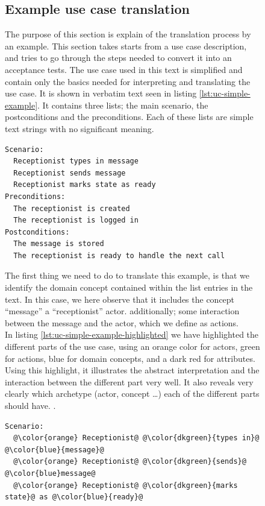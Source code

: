 \begin{figure}[!htbp]

\subsection{Example use case translation}
The purpose of this section is explain of the translation process by an example.
This section takes starts from a use case description, and tries to go through the steps needed to convert it into an acceptance tests. The use case used in this text is simplified and contain only the basics needed for interpreting and translating the use case. It is shown in verbatim text seen in listing \ref{lst:uc-simple-example}. It contains three lists; the main scenario, the postconditions and the preconditions. Each of these lists are simple text strings with no significant meaning.
\begin{lstlisting}[frame=single,style=usecase, caption=Use case example, label=lst:uc-simple-example]
Scenario:
  Receptionist types in message
  Receptionist sends message
  Receptionist marks state as ready 
Preconditions:
  The receptionist is created
  The receptionist is logged in
Postconditions:
  The message is stored
  The receptionist is ready to handle the next call
\end{lstlisting}
The first thing we need to do to translate this example, is that we identify the domain concept contained within the list entries in the text. In this case, we here observe that it includes the concept ``message'' a ``receptionist'' actor. additionally; some interaction between the message and the actor, which we define as actions.\\
In listing \ref{lst:uc-simple-example-highlighted} we have highlighted the different parts of the use case, using an orange color for actors, green for actions, blue for domain concepts, and a dark red for attributes. Using this highlight, it illustrates the abstract interpretation and the interaction between the different part very well. It also reveals very clearly which archetype (actor, concept \dots) each of the different parts should have. 
.
\begin{lstlisting}[frame=single,style=usecase, caption=Use case example with its different parts highlighted, label=lst:uc-simple-example-highlighted]
Scenario:
  @\color{orange} Receptionist@ @\color{dkgreen}{types in}@ @\color{blue}{message}@
  @\color{orange} Receptionist@ @\color{dkgreen}{sends}@ @\color{blue}message@
  @\color{orange} Receptionist@ @\color{dkgreen}{marks state}@ as @\color{blue}{ready}@

\end{lstlisting}
\end{figure}
